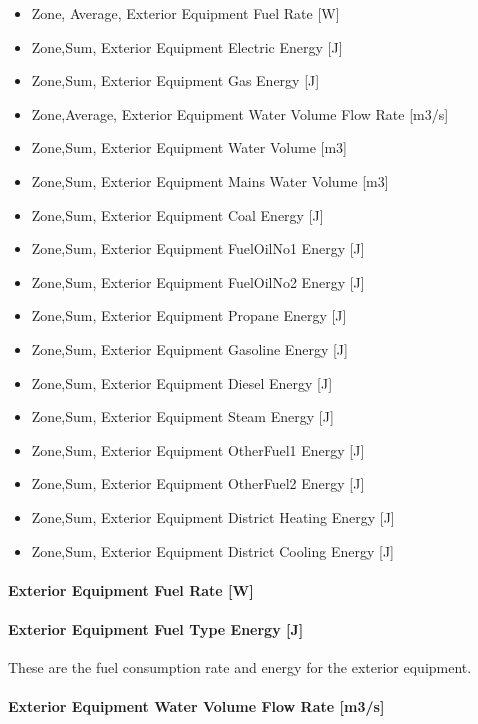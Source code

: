 \begin{itemize}
\item
  Zone, Average, Exterior Equipment Fuel Rate {[}W{]}
\item
  Zone,Sum, Exterior Equipment Electric Energy {[}J{]}
\item
  Zone,Sum, Exterior Equipment Gas Energy {[}J{]}
\item
  Zone,Average, Exterior Equipment Water Volume Flow Rate {[}m3/s{]}
\item
  Zone,Sum, Exterior Equipment Water Volume {[}m3{]}
\item
  Zone,Sum, Exterior Equipment Mains Water Volume {[}m3{]}
\item
  Zone,Sum, Exterior Equipment Coal Energy {[}J{]}
\item
  Zone,Sum, Exterior Equipment FuelOilNo1 Energy {[}J{]}
\item
  Zone,Sum, Exterior Equipment FuelOilNo2 Energy {[}J{]}
\item
  Zone,Sum, Exterior Equipment Propane Energy {[}J{]}
\item
  Zone,Sum, Exterior Equipment Gasoline Energy {[}J{]}
\item
  Zone,Sum, Exterior Equipment Diesel Energy {[}J{]}
\item
  Zone,Sum, Exterior Equipment Steam Energy {[}J{]}
\item
  Zone,Sum, Exterior Equipment OtherFuel1 Energy {[}J{]}
\item
  Zone,Sum, Exterior Equipment OtherFuel2 Energy {[}J{]}
\item
  Zone,Sum, Exterior Equipment District Heating Energy {[}J{]}
\item
  Zone,Sum, Exterior Equipment District Cooling Energy {[}J{]}
\end{itemize}

\paragraph{Exterior Equipment Fuel Rate {[}W{]}}\label{exterior-equipment-fuel-rate-w}

\paragraph{Exterior Equipment Fuel Type Energy {[}J{]}}\label{exterior-equipment-fuel-type-energy-j}

These are the fuel consumption rate and energy for the exterior equipment.

\paragraph{Exterior Equipment Water Volume Flow Rate {[}m3/s{]}}\label{exterior-equipment-water-volume-flow-rate-m3s}


